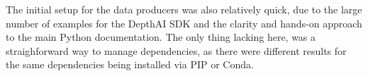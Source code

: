 The initial setup for the data producers was also relatively quick, due to the large number of examples for the DepthAI \ac{SDK} and the clarity and hands-on approach to the main Python documentation.
The only thing lacking here, was a straighforward way to manage dependencies, as there were different results for the same dependencies being installed via PIP or Conda.

